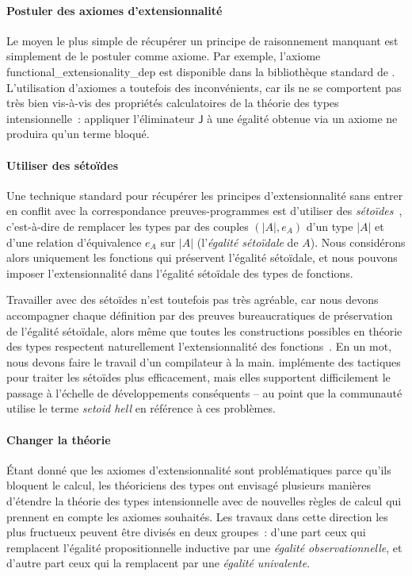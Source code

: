 \paragraph*{Postuler des axiomes d'extensionnalité}
% 
Le moyen le plus simple de récupérer un principe de raisonnement manquant 
est simplement de le postuler comme axiome. 
% 
% 
Par exemple, l'axiome \textsf{functional\_extensionality\_dep} est disponible 
dans la bibliothèque standard de \Coq. 
% 
L'utilisation d'axiomes a toutefois des inconvénients, car ils ne se comportent 
pas très bien vis-à-vis des propriétés calculatoires de la théorie des types 
intensionnelle~: appliquer l'éliminateur \( \mathsf{J} \) à une égalité obtenue 
via un axiome ne produira qu'un terme bloqué.

\paragraph*{Utiliser des sétoïdes}
% 
Une technique standard pour récupérer les principes d'extensionnalité sans entrer
en conflit avec la correspondance preuves-programmes est d'utiliser des 
\emph{sétoïdes}~, c'est-à-dire de remplacer les types par 
des couples \( (|A|, e_A) \) d'un type \( |A| \) et d'une relation d'équivalence 
\( e_A \) sur \( |A| \) (l'\emph{égalité sétoïdale} de \( A \)).
% 
Nous considérons alors uniquement les fonctions qui préservent l'égalité 
sétoïdale, et nous pouvons imposer l'extensionnalité dans l'égalité sétoïdale 
des types de fonctions.

Travailler avec des sétoïdes n'est toutefois pas très agréable, car nous devons accompagner 
chaque définition par des preuves bureaucratiques de préservation de l'égalité
sétoïdale, alors même que toutes les constructions possibles en théorie des types 
respectent naturellement l'extensionnalité des fonctions~. 
% 
En un mot, nous devons faire le travail d'un compilateur à la main. 
% 
\Coq implémente des tactiques pour traiter les sétoïdes plus efficacement, mais 
elles supportent difficilement le passage à l'échelle de développements conséquents -- 
au point que la communauté utilise le terme \emph{setoid hell} en référence à ces 
problèmes.

\paragraph*{Changer la théorie}
% 
Étant donné que les axiomes d'extensionnalité sont problématiques parce qu'ils 
bloquent le calcul, les théoriciens des types ont envisagé plusieurs manières 
d'étendre la théorie des types intensionnelle avec de nouvelles règles de calcul 
qui prennent en compte les axiomes souhaités. 
% 
Les travaux dans cette direction les plus fructueux peuvent être divisés en deux groupes~: d'une part ceux qui 
remplacent l'égalité propositionnelle inductive par une 
\emph{égalité observationnelle}, et d'autre part ceux qui la remplacent par une 
\emph{égalité univalente}.

